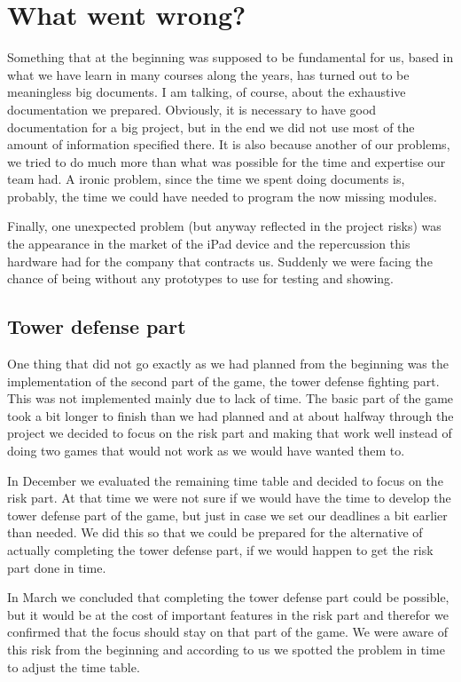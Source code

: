 \documentclass[12pt,a4paper]{article}
\begin{document}
\section{What went wrong?}

Something that at the beginning was supposed to be fundamental for us, based in what we have learn in many courses along the years, has turned out to be meaningless big documents. I am talking, of course, about the exhaustive documentation we prepared. Obviously, it is necessary to have good documentation for a big project, but in the end we did not use most of the amount of information specified there. It is also because another of our problems, we tried to do much more than what was possible for the time and expertise our team had. A ironic problem, since the time we spent doing documents is, probably, the time we could have needed to program the now missing modules.

Finally, one unexpected problem (but anyway reflected in the project risks) was the appearance in the market of the iPad device and the repercussion this hardware had for the company that contracts us. Suddenly we were facing the chance of being without any prototypes to use for testing and showing.

\subsection {Tower defense part}
One thing that did not go exactly as we had planned from the beginning was the implementation of the second part of the game, the tower defense fighting part. This was not implemented mainly due to lack of time. The basic part of the game took a bit longer to finish than we had planned and at about halfway through the project we decided to focus on the risk part and making that work well instead of doing two games that would not work as we would have wanted them to. 

In December we evaluated the remaining time table and decided to focus on the risk part. At that time we were not sure if we would have the time to develop the tower defense part of the game, but just in case we set our deadlines a bit earlier than needed. We did this so that we could be prepared for the alternative of actually completing the tower defense part, if we would happen to get the risk part done in time. 

In March we concluded that completing the tower defense part could be possible, but it would be at the cost of important features in the risk part and therefor we confirmed that the focus should stay on that part of the game. We were aware of this risk from the beginning and according to us we spotted the problem in time to adjust the time table.
\end{document}
